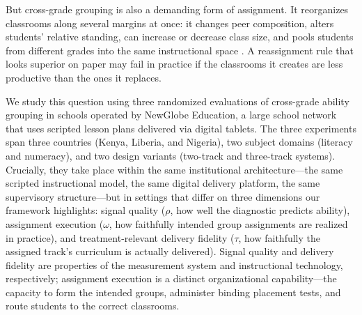 \documentclass[11pt]{article}
\begin{document}
But cross-grade grouping is also a demanding form of assignment. It reorganizes classrooms along several margins at once: it changes peer composition, alters students' relative standing, can increase or decrease class size, and pools students from different grades into the same instructional space \citep{betts:2011}. A reassignment rule that looks superior on paper may fail in practice if the classrooms it creates are less productive than the ones it replaces.

We study this question using three randomized evaluations of cross-grade ability grouping in schools operated by NewGlobe Education, a large school network that uses scripted lesson plans delivered via digital tablets. The three experiments span three countries (Kenya, Liberia, and Nigeria), two subject domains (literacy and numeracy), and two design variants (two-track and three-track systems). Crucially, they take place within the same institutional architecture---the same scripted instructional model, the same digital delivery platform, the same supervisory structure---but in settings that differ on three dimensions our framework highlights: signal quality ($\rho$, how well the diagnostic predicts ability), assignment execution ($\omega$, how faithfully intended group assignments are realized in practice), and treatment-relevant delivery fidelity ($\tau$, how faithfully the assigned track's curriculum is actually delivered). Signal quality and delivery fidelity are properties of the measurement system and instructional technology, respectively; assignment execution is a distinct organizational capability---the capacity to form the intended groups, administer binding placement tests, and route students to the correct classrooms.
\end{document}
